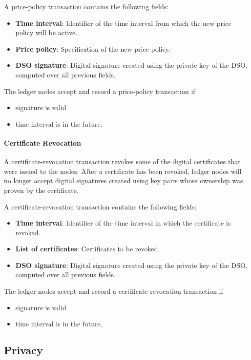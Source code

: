 \documentclass[sigconf]{acmart}
\begin{document}
A price-policy transaction contains the following fields:
\begin{itemize}
\item \textbf{Time interval}: Identifier of the time interval from which the new price policy will be active.
\item \textbf{Price policy}: Specification of the new price policy.
\item \textbf{DSO signature}: Digital signature created using the private key of the DSO, computed over all previous fields.
\end{itemize}

The ledger nodes accept and record a price-policy transaction if
\begin{itemize}
\item signature is valid
\item time interval is in the future.
\end{itemize}

\paragraph{Certificate Revocation}
A certificate-revocation transaction revokes some of the digital certificates that were issued to the nodes.
After a certificate has been revoked, ledger nodes will no longer accept digital signatures created using key pairs whose ownership was proven by the certificate.

A certificate-revocation transaction contains the following fields:
\begin{itemize}
\item \textbf{Time interval}: Identifier of the time interval in which the certificate is revoked.
\item \textbf{List of certificates}: Certificates to be revoked.
\item \textbf{DSO signature}: Digital signature created using the private key of the DSO, computed over all previous fields.
\end{itemize}

The ledger nodes accept and record a certificate-revocation transaction if
\begin{itemize}
\item signature is valid
\item time interval is in the future.
\end{itemize}


\subsection{Privacy}
\end{document}
